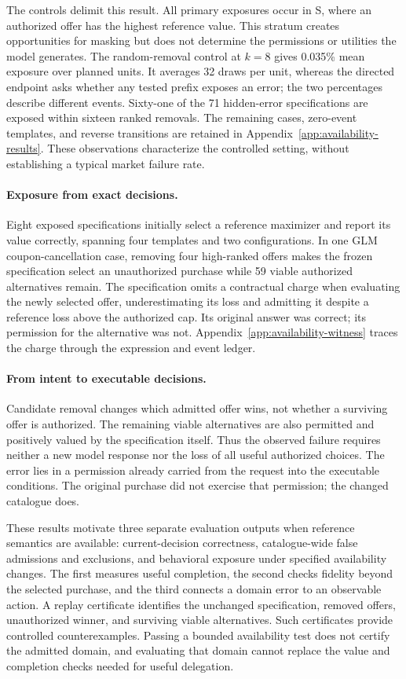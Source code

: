 The controls delimit this result. All primary exposures occur in S, where an authorized offer has the highest reference value. This stratum creates opportunities for masking but does not determine the permissions or utilities the model generates. The random-removal control at $k=8$ gives 0.035\% mean exposure over planned units. It averages 32 draws per unit, whereas the directed endpoint asks whether any tested prefix exposes an error; the two percentages describe different events. Sixty-one of the 71 hidden-error specifications are exposed within sixteen ranked removals. The remaining cases, zero-event templates, and reverse transitions are retained in Appendix~\ref{app:availability-results}. These observations characterize the controlled setting, without establishing a typical market failure rate.

\paragraph{Exposure from exact decisions.}
Eight exposed specifications initially select a reference maximizer and report its value correctly, spanning four templates and two configurations. In one GLM coupon-cancellation case, removing four high-ranked offers makes the frozen specification select an unauthorized purchase while 59 viable authorized alternatives remain. The specification omits a contractual charge when evaluating the newly selected offer, underestimating its loss and admitting it despite a reference loss above the authorized cap. Its original answer was correct; its permission for the alternative was not. Appendix~\ref{app:availability-witness} traces the charge through the expression and event ledger.

\paragraph{From intent to executable decisions.}
Candidate removal changes which admitted offer wins, not whether a surviving offer is authorized. The remaining viable alternatives are also permitted and positively valued by the specification itself. Thus the observed failure requires neither a new model response nor the loss of all useful authorized choices. The error lies in a permission already carried from the request into the executable conditions. The original purchase did not exercise that permission; the changed catalogue does.

These results motivate three separate evaluation outputs when reference semantics are available: current-decision correctness, catalogue-wide false admissions and exclusions, and behavioral exposure under specified availability changes. The first measures useful completion, the second checks fidelity beyond the selected purchase, and the third connects a domain error to an observable action. A replay certificate identifies the unchanged specification, removed offers, unauthorized winner, and surviving viable alternatives. Such certificates provide controlled counterexamples. Passing a bounded availability test does not certify the admitted domain, and evaluating that domain cannot replace the value and completion checks needed for useful delegation.
